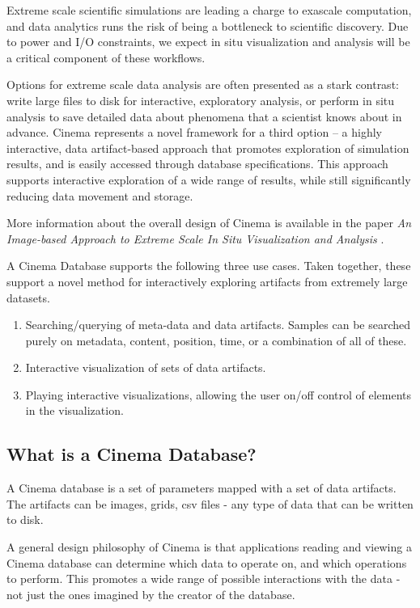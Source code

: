 \label{sec:cinema}

Extreme scale scientific simulations are leading a charge to exascale computation, and data analytics runs the risk of being a bottleneck to scientific discovery. Due to power and I/O constraints, we expect in situ visualization and analysis will be a critical component of these workflows. 

Options for extreme scale data analysis are often presented as a stark contrast: write large files to disk for interactive, exploratory analysis, or perform in situ analysis to save detailed data about phenomena that a scientist knows about in advance. Cinema represents a novel framework for a third option – a highly interactive, data artifact-based approach that promotes exploration of simulation results, and is easily accessed through database specifications. This approach supports interactive exploration of a wide range of results, while still significantly reducing data movement and storage.

More information about the overall design of Cinema is available in the paper \textit{An Image-based Approach to Extreme Scale In Situ Visualization and Analysis} \cite{cinemaSC14}.

A Cinema Database supports the following three use cases. Taken together, these support a novel method for interactively exploring artifacts from extremely large datasets.

\begin{enumerate}
\item Searching/querying of meta-data and data artifacts. Samples can be searched purely on metadata, content, position, time, or a combination of all of these.
\item Interactive visualization of sets of data artifacts.
\item Playing interactive visualizations, allowing the user on/off control of elements in the visualization.
\end{enumerate}

\subsection{What is a Cinema Database?}
A Cinema database is a set of parameters mapped with a set of data artifacts. The artifacts can be images, grids, csv files - any type of data that can be written to disk.

A general design philosophy of Cinema is that applications reading and viewing a Cinema database can determine which data to operate on, and which operations to perform. This promotes a wide range of possible interactions with the data - not just the ones imagined by the creator of the database.

